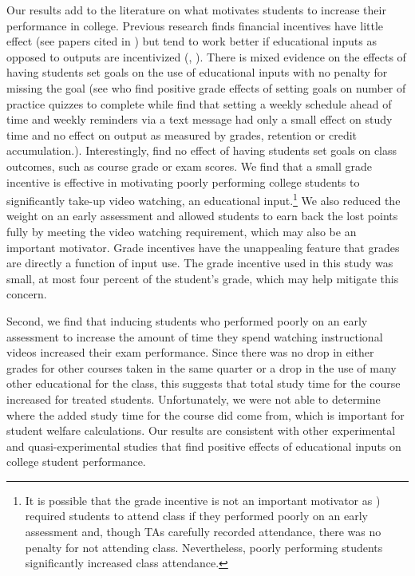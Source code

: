 \documentclass[12pt]{article}
\begin{document}
Our results add to the literature on what motivates students to increase their performance in college. Previous research finds financial incentives have little effect (see papers cited in \textcite{gmr2011}) but tend to work better if educational inputs as opposed to outputs are incentivized (\textcite{fryer2011}, \textcite{gmr2011}). There is mixed evidence on the effects of having students set goals on the use of educational inputs with no penalty for missing the goal (see \textcite{cgpr2020} who find positive grade effects of setting goals on number of practice quizzes to complete while \textcite{oppp2019} find that setting a weekly schedule ahead of time and weekly reminders via a text message had only a small effect on study time and no effect on output as measured by grades, retention or credit accumulation.). Interestingly, \textcite{cgpr2020} find no effect of having students set goals on class outcomes, such as course grade or exam scores. We find that a small grade incentive is effective in motivating poorly performing college students to significantly take-up video watching, an educational input.\footnote{It is possible that the grade incentive is not an important motivator as \textcite{dgm2010}) required students to attend class if they performed poorly on an early assessment and, though TAs carefully recorded attendance, there was no penalty for not attending class. Nevertheless, poorly performing students significantly increased class attendance.} We also reduced the weight on an early assessment and allowed students to earn back the lost points fully by meeting the video watching requirement, which may also be an important motivator. Grade incentives have the unappealing feature that grades are directly a function of input use. The grade incentive used in this study was small, at most four percent of the student's grade, which may help mitigate this concern.

Second, we find that inducing students who performed poorly on an early assessment to increase the amount of time they spend watching instructional videos increased their exam performance. Since there was no drop in either grades for other courses taken in the same quarter or a drop in the use of many other educational for the class, this suggests that total study time for the course increased for treated students. Unfortunately, we were not able to determine where the added study time for the course did come from, which is important for student welfare calculations. Our results are consistent with other experimental and quasi-experimental studies that find positive effects of educational inputs on college student performance. %
\end{document}
